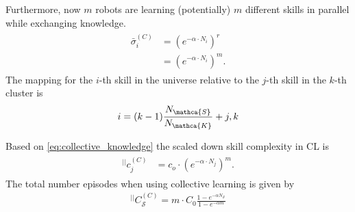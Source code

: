 Furthermore, now $m$ robots are learning (potentially) $m$ different skills in parallel while exchanging knowledge.
\begin{align}\label{eq:collective_knowledge}
\begin{split}
    \bar{\sigma}_i^{(C)} &= \left({e^{-\alpha \cdot N_i}}\right)^{r}\\
    &= \left({e^{-\alpha \cdot N_i}}\right)^{m}.
\end{split}
\end{align}
The mapping for the $i$-th skill in the universe relative to the $j$-th skill in the $k$-th cluster is
\begin{equation}
    i = (k-1)\frac{N_\mathca{S}}{N_\mathca{K}} + j,k
\end{equation}

Based on \eqref{eq:collective_knowledge} the scaled down skill complexity in CL is 
\begin{align}\label{eq:collective_knowledge}
\begin{split}
    ^{||}c_j^{(C)} &= c_o \cdot \left({e^{-\alpha \cdot N_j}}\right)^{m}.
\end{split}
\end{align}
The total number episodes when using collective learning is given by
\begin{eqnarray}
	^{||}C_\mathcal{S}^{(C)} = m \cdot C_0 \frac{1 - e^{-\alpha N_\mathcal{S}}}{1 - e^{-\alpha m}}
\end{eqnarray}
